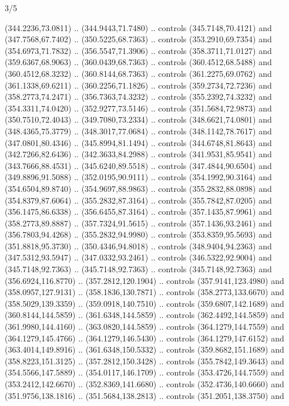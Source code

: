 \begin{flagdescription}{3/5}
\begin{scope}[xshift=0.5\flaglength,yshift=0.5\flagwidth,scale=\flagwidth/270]
\begin{scope}[y=0.8pt, x=0.8pt, yscale=-1,shift={(-281.25,-168.75)}]
  (344.2236,73.0811) .. (344.9443,71.7480) .. controls (345.7148,70.4121) and
  (347.7568,67.7402) .. (350.5225,68.7363) .. controls (353.2910,69.7354) and
  (354.6973,71.7832) .. (356.5547,71.3906) .. controls (358.3711,71.0127) and
  (359.6367,68.9063) .. (360.0439,68.7363) .. controls (360.4512,68.5488) and
  (360.4512,68.3232) .. (360.8144,68.7363) .. controls (361.2275,69.0762) and
  (361.1338,69.6211) .. (360.2256,71.1826) .. controls (359.2734,72.7236) and
  (358.2773,74.2471) .. (356.7363,74.3232) .. controls (355.2392,74.3232) and
  (354.3311,74.0420) .. (352.9277,73.5146) .. controls (351.5684,72.9873) and
  (350.7510,72.4043) .. (349.7080,73.2334) .. controls (348.6621,74.0801) and
  (348.4365,75.3779) .. (348.3017,77.0684) .. controls (348.1142,78.7617) and
  (347.0801,80.4346) .. (345.8994,81.1494) .. controls (344.6748,81.8643) and
  (342.7266,82.6436) .. (342.3633,84.2988) .. controls (341.9531,85.9541) and
  (343.7666,88.4531) .. (345.6240,89.5518) .. controls (347.4844,90.6504) and
  (349.8896,91.5088) .. (352.0195,90.9111) .. controls (354.1992,90.3164) and
  (354.6504,89.8740) .. (354.9697,88.9863) .. controls (355.2832,88.0898) and
  (354.8379,87.6064) .. (355.2832,87.3164) .. controls (355.7842,87.0205) and
  (356.1475,86.6338) .. (356.6455,87.3164) .. controls (357.1435,87.9961) and
  (358.2773,89.8887) .. (357.7324,91.5615) .. controls (357.1436,93.2461) and
  (356.7803,94.4268) .. (355.2832,94.9980) .. controls (353.8359,95.5693) and
  (351.8818,95.3730) .. (350.4346,94.8018) .. controls (348.9404,94.2363) and
  (347.5312,93.5947) .. (347.0332,93.2461) .. controls (346.5322,92.9004) and
  (345.7148,92.7363) .. (345.7148,92.7363) .. controls (345.7148,92.7363) and
  (356.6924,116.8770) .. (357.2812,120.1904) .. controls (357.9141,123.4980) and
  (358.0957,127.9131) .. (358.1836,130.7871) .. controls (358.2773,133.6670) and
  (358.5029,139.3359) .. (359.0918,140.7510) .. controls (359.6807,142.1689) and
  (360.8144,144.5859) .. (361.6348,144.5859) .. controls (362.4492,144.5859) and
  (361.9980,144.4160) .. (363.0820,144.5859) .. controls (364.1279,144.7559) and
  (364.1279,145.4766) .. (364.1279,146.5430) .. controls (364.1279,147.6152) and
  (363.4014,149.8916) .. (361.6348,150.5332) .. controls (359.8682,151.1689) and
  (358.8223,151.3125) .. (357.2812,150.3428) .. controls (355.7842,149.3643) and
  (354.5566,147.5889) .. (354.0117,146.1709) .. controls (353.4726,144.7559) and
  (353.2412,142.6670) .. (352.8369,141.6680) .. controls (352.4736,140.6660) and
  (351.9756,138.1816) .. (351.5684,138.2813) .. controls (351.2051,138.3750) and

\end{scope}
\end{scope}
\end{flagdescription}
